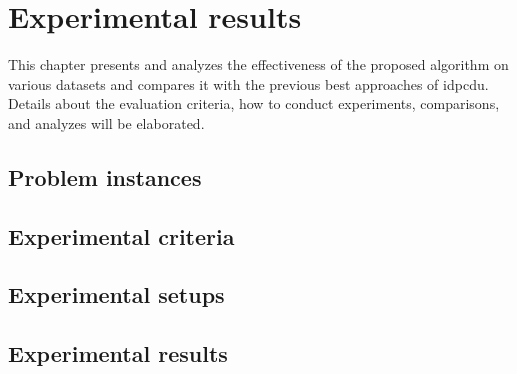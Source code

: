 \chapter{Experimental results}
\label{chap:chap4}
This chapter presents and analyzes the effectiveness of the proposed algorithm on various datasets and compares it with the previous best approaches of \gls{idpcdu}. Details about the evaluation criteria, how to conduct experiments, comparisons, and analyzes will be elaborated.

\section{Problem instances}
\label{experiment:dataset}


\section{Experimental criteria}
\label{experiment:criteria}


\section{Experimental setups}
\label{experiment:setup}


\section{Experimental results}
\label{experiment:result}


